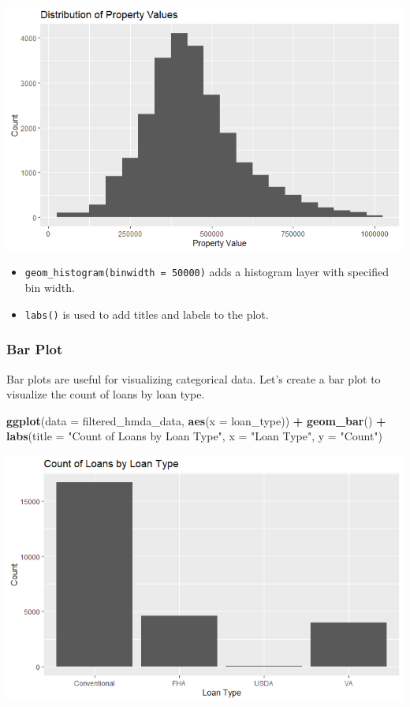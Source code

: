 \documentclass[
]{book}
\newenvironment{Shaded}{\begin{snugshade}}{\end{snugshade}}
\newcommand{\AttributeTok}[1]{\textcolor[rgb]{0.13,0.29,0.53}{#1}}
\newcommand{\FunctionTok}[1]{\textcolor[rgb]{0.13,0.29,0.53}{\textbf{#1}}}
\newcommand{\NormalTok}[1]{#1}
\newcommand{\SpecialCharTok}[1]{\textcolor[rgb]{0.81,0.36,0.00}{\textbf{#1}}}
\newcommand{\StringTok}[1]{\textcolor[rgb]{0.31,0.60,0.02}{#1}}
\providecommand{\tightlist}{%
  \setlength{\itemsep}{0pt}\setlength{\parskip}{0pt}}
\begin{document}
\includegraphics{images/histogram_plot.PNG}

\begin{itemize}
\tightlist
\item
  \texttt{geom\_histogram(binwidth\ =\ 50000)} adds a histogram layer with specified bin width.
\item
  \texttt{labs()} is used to add titles and labels to the plot.
\end{itemize}

\hypertarget{bar-plot}{%
\subsubsection*{Bar Plot}\label{bar-plot}}

Bar plots are useful for visualizing categorical data. Let's create a bar plot to visualize the count of loans by loan type.

\begin{Shaded}
\begin{Highlighting}[]
\FunctionTok{ggplot}\NormalTok{(}\AttributeTok{data =}\NormalTok{ filtered\_hmda\_data, }\FunctionTok{aes}\NormalTok{(}\AttributeTok{x =}\NormalTok{ loan\_type)) }\SpecialCharTok{+}
  \FunctionTok{geom\_bar}\NormalTok{() }\SpecialCharTok{+}
  \FunctionTok{labs}\NormalTok{(}\AttributeTok{title =} \StringTok{"Count of Loans by Loan Type"}\NormalTok{,}
       \AttributeTok{x =} \StringTok{"Loan Type"}\NormalTok{,}
       \AttributeTok{y =} \StringTok{"Count"}\NormalTok{)}
\end{Highlighting}
\end{Shaded}

\includegraphics{images/bar_plot.PNG}
\end{document}
